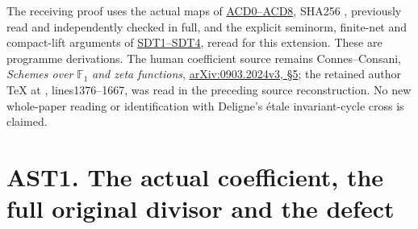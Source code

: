 The receiving proof uses the actual maps of
\href{https://github.com/KokunoYumeto/zeta-function-research-reader/blob/36a82ecca98addb8a98b48204e349737856c7223/workbenches/splitzero-tandem/continuations/20260924-cohomology-weight-and-character-lifts/gct-weight-control/proofs/CC_ADJOINT_DEFECT_CONTINUOUS_DUAL.md}{ACD0--ACD8},
SHA256
,
previously read and independently checked in full, and the explicit
seminorm, finite-net and compact-lift arguments of
\href{https://github.com/KokunoYumeto/zeta-function-research-reader/blob/36a82ecca98addb8a98b48204e349737856c7223/workbenches/splitzero-tandem/continuations/20260924-cohomology-weight-and-character-lifts/gct-weight-control/proofs/CC_STRONG_DUAL_TOPOLOGY_AND_JETS.md}{SDT1--SDT4},
reread for this extension. These are programme derivations. The human
coefficient source remains Connes--Consani, \emph{Schemes over}
\(\mathbb F_1\) \emph{and zeta functions},
\href{https://arxiv.org/abs/0903.2024v3}{arXiv:0903.2024v3, §5}; the
retained author TeX at
\href{https://arxiv.org/abs/0903.2024v3}{},
lines1376--1667, was read in the preceding source reconstruction. No new
whole-paper reading or identification with Deligne's étale
invariant-cycle cross is claimed.

\section{AST1. The actual coefficient, the full original divisor and the
defect}\label{ast1.-the-actual-coefficient-the-full-original-divisor-and-the-defect}

